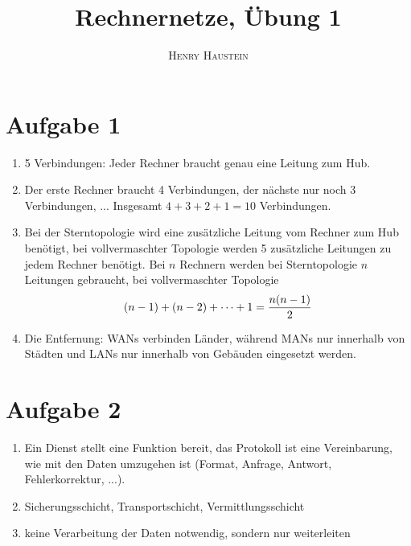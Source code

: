 \documentclass{article}
\title{\textbf{Rechnernetze, Übung 1}}
\author{\textsc{Henry Haustein}}
\date{}
\begin{document}
	\maketitle
	
	\section*{Aufgabe 1}
	\begin{enumerate}[label=(\alph*)]
		\item 5 Verbindungen: Jeder Rechner braucht genau eine Leitung zum Hub.
		\item Der erste Rechner braucht 4 Verbindungen, der nächste nur noch 3 Verbindungen, ... Insgesamt $4+3+2+1=10$ Verbindungen.
		\item Bei der Sterntopologie wird eine zusätzliche Leitung vom Rechner zum Hub benötigt, bei vollvermaschter Topologie werden 5 zusätzliche Leitungen zu jedem Rechner benötigt. Bei $n$ Rechnern werden bei Sterntopologie $n$ Leitungen gebraucht, bei vollvermaschter Topologie
		\begin{align}
			(n-1) + (n-2) + \dots + 1 = \frac{n(n-1)}{2} \notag
		\end{align}
		\item Die Entfernung: WANs verbinden Länder, während MANs nur innerhalb von Städten und LANs nur innerhalb von Gebäuden eingesetzt werden.
	\end{enumerate}

	\section*{Aufgabe 2}
	\begin{enumerate}[label=(\alph*)]
		\item Ein Dienst stellt eine Funktion bereit, das Protokoll ist eine Vereinbarung, wie mit den Daten umzugehen ist (Format, Anfrage, Antwort, Fehlerkorrektur, ...).
		\item Sicherungsschicht, Transportschicht, Vermittlungsschicht
		\item keine Verarbeitung der Daten notwendig, sondern nur weiterleiten
	\end{enumerate}
\end{document}
